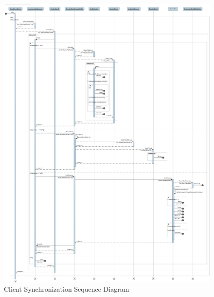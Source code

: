\begin{figure}[H]
  \includegraphics[width=\textwidth]{illustrations/ServerSynchfulldiagram.png}
  \caption{Client Synchronization Sequence Diagram}
  \label{clientsyncsequencediagram}
\end{figure}
